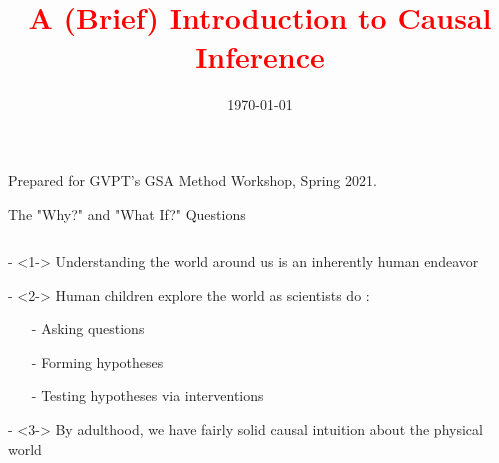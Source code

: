 \documentclass[notes,11pt, aspectratio=169, usenames, dvipsnames]{beamer}
\title[]{\textcolor{red}{A (Brief) Introduction to Causal Inference}}
\author[EAJ]{}
\institute[UMDCP]{\small{\begin{tabular}{c c c}
\multicolumn{3}{c}{Evan A. Jones} \\
\multicolumn{3}{c}{University of Maryland -- College Park}


\end{tabular}}}
\date{\today}
\newenvironment{wideitemize}{\itemize\addtolength{\itemsep}{10pt}}{\enditemize}
\begin{document}
\begin{frame}
\maketitle
  \centering Prepared for GVPT's GSA Method Workshop, Spring 2021.
\end{frame}

\begin{frame}{The "Why?" and "What If?" Questions}
	\begin{columns}[T] %
		\begin{column}{.58\textwidth}
			\begin{wideitemize}
				\item[-]<1-> Understanding the world around us is an inherently human endeavor
				\item[-]<2-> Human children explore the world as scientists do \citep{Gopnik2012, BuchsbaumEtal2012}: 
					\begin{itemize}
						\item[-] Asking questions
						\item[-] Forming hypotheses
						\item[-] Testing hypotheses via interventions \citep{GopnikEtal2004}
					\end{itemize}
				\item[-]<3-> By adulthood, we have fairly solid causal intuition about the physical world
			\end{wideitemize}
		\end{column}%
		\hfill%
		\begin{column}{.38\textwidth}
		\end{column}%
	\end{columns}
\end{frame}
\end{document}
